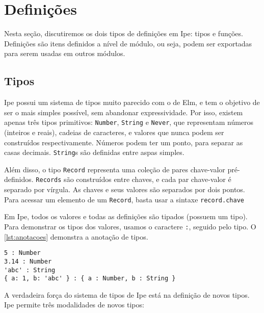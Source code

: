 \section{Definições}\label{sec:definicoes}

Nesta seção, discutiremos os dois tipos de definições em Ipe: tipos e funções.
Definições são itens definidos a nível de módulo, ou seja, podem ser exportadas
para serem usadas em outros módulos.

\subsection{Tipos}\label{sec:tipos}

Ipe possui um sistema de tipos muito parecido com o de Elm, e tem o objetivo de
ser o mais simples possível, sem abandonar expressividade. Por isso, existem
apenas três tipos primitivos: \texttt{Number}, \texttt{String} e \texttt{Never},
que representam números (inteiros e reais), cadeias de caracteres, e valores que
nunca podem ser construídos respectivamente. Números podem ter um ponto,
para separar as casas decimais. \texttt{String}s são definidas entre aspas simples.

Além disso, o tipo \texttt{Record} representa uma coleção de pares chave-valor
pré-definidos. \texttt{Records} são construídos entre chaves, e cada par chave-valor
é separado por vírgula. As chaves e seus valores são separados por dois pontos.
Para acessar um elemento de um \texttt{Record}, basta usar a sintaxe \texttt{record.chave}


Em Ipe, todos os valores e todas as definições são tipados (possuem um tipo). Para
demonstrar os tipos dos valores, usamos o caractere \texttt{:}, seguido pelo tipo.
O \autoref{lst:anotacoes} demonstra a anotação de tipos.

\begin{lstlisting}[label={lst:anotacoes},caption={Exemplo de anotação de tipos}]
5 : Number
3.14 : Number
'abc' : String
{ a: 1, b: 'abc' } : { a : Number, b : String }
\end{lstlisting}

A verdadeira força do sistema de tipos de Ipe está na definição de novos tipos.
Ipe permite três modalidades de novos tipos:

